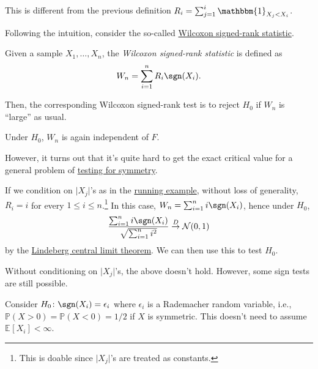 \begin{prev}
	This is different from the previous definition \(R_i = \sum_{j=1}^{i} \mathbbm{1}_{X_j < X_i} \).
\end{prev}

Following the intuition, consider the so-called \hyperref[def:Wilcoxon-signed-rank-statistic]{Wilcoxon signed-rank statistic}.

\begin{definition}\label{def:Wilcoxon-signed-rank-statistic}
	Given a sample \(X_1, \dots , X_n\), the \emph{Wilcoxon signed-rank statistic} is defined as
	\[
		W_n = \sum_{i=1}^{n} R_i \sgn (X_i).
	\]
\end{definition}

Then, the corresponding Wilcoxon signed-rank test is to reject \(H_0\) if \(W_n\) is ``large'' as usual.

\begin{note}
	Under \(H_0\), \(W_n\) is again independent of \(F\).
\end{note}

However, it turns out that it's quite hard to get the exact critical value for a general problem of \hyperref[prb:testing-symmetry]{testing for symmetry}.

\begin{eg}
	If we condition on \(\vert X_j \vert \)'s as in the \hyperref[eg:two-sample-t-statistic]{running example}, without loss of generality, \(R_i = i\) for every \(1 \leq i \leq n\).\footnote{This is doable since \(\vert X_j \vert \)'s are treated as constants.} In this case, \(W_n = \sum_{i=1}^{n} i \sgn (X_i)\), hence under \(H_0\),
	\[
		\frac{\sum_{i=1}^{n} i \sgn (X_i)}{\sqrt{\sum_{i=1}^{n} i^2} }
		\overset{D}{\to} \mathcal{N} (0, 1)
	\]
	by the \hyperref[thm:Lindeberg-CLT]{Lindeberg central limit theorem}. We can then use this to test \(H_0\).
\end{eg}

Without conditioning on \(\vert X_j \vert \)'s, the above doesn't hold. However, some sign tests are still possible.

\begin{intuition}
	Consider \(H_0 \colon \sgn (X_i) = \epsilon _i\) where \(\epsilon _i\) is a Rademacher random variable, i.e., \(\mathbb{P} (X > 0) = \mathbb{P} (X < 0) = 1 / 2\) if \(X\) is symmetric. This doesn't need to assume \(\mathbb{E}_{}[X_i] < \infty \).
\end{intuition}

